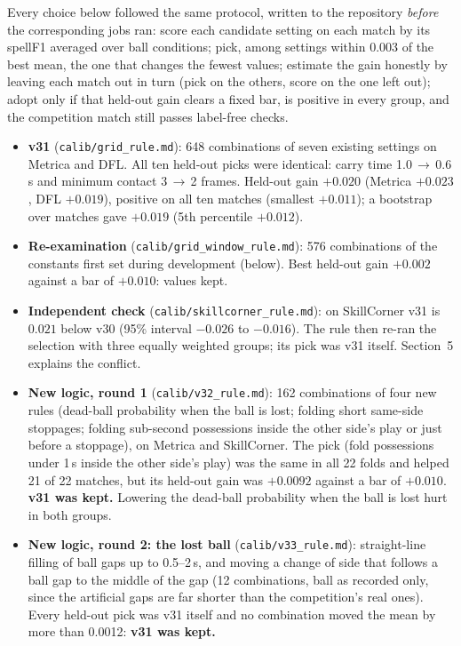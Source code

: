 \documentclass[11pt,a4paper]{article}
\newcommand{\code}[1]{\texttt{#1}}
\newcommand{\st}[1]{\textbf{#1}}
\begin{document}
Every choice below followed the same protocol, written to the
repository \emph{before} the corresponding jobs ran: score each candidate setting on each match by
its spellF1 averaged over ball conditions; pick, among settings within 0.003 of the best mean, the
one that changes the fewest values; estimate the gain honestly by leaving each match out in turn
(pick on the others, score on the one left out); adopt only if that held-out gain clears a fixed
bar, is positive in every group, and the competition match still passes label-free checks.

\begin{itemize}
\item \st{v31} (\code{calib/grid\_rule.md}): 648 combinations of seven existing settings on Metrica and
DFL. All ten held-out picks were identical: carry time 1.0\,$\rightarrow$\,0.6\,s and minimum contact
3\,$\rightarrow$\,2 frames. Held-out gain $+0.020$ (Metrica $+0.023$, DFL $+0.019$), positive on all ten
matches (smallest $+0.011$); a bootstrap over matches gave $+0.019$ (5th percentile $+0.012$).
\item \st{Re-examination} (\code{calib/grid\_window\_rule.md}): 576 combinations of the constants
first set during development (below). Best held-out gain $+0.002$ against a bar of $+0.010$: values kept.
\item \st{Independent check} (\code{calib/skillcorner\_rule.md}): on SkillCorner v31 is $0.021$ below v30
(95\% interval $-0.026$ to $-0.016$). The rule then re-ran the selection with three equally weighted
groups; its pick was v31 itself. Section~5 explains the conflict.
\item \st{New logic, round 1} (\code{calib/v32\_rule.md}): 162 combinations of four new rules
(dead-ball probability when the ball is lost; folding short same-side stoppages; folding sub-second
possessions inside the other side's play or just before a stoppage), on Metrica and SkillCorner.
The pick (fold possessions under 1\,s inside the other side's play) was the same in all 22 folds and
helped 21 of 22 matches, but its held-out gain was $+0.0092$ against a bar of $+0.010$. \textbf{v31
was kept.} Lowering the dead-ball probability when the ball is lost hurt in both groups.
\item \st{New logic, round 2: the lost ball} (\code{calib/v33\_rule.md}): straight-line filling of ball gaps up to 0.5--2\,s, and moving a change of side that follows a ball gap to the middle of the gap (12 combinations, ball as recorded only, since the artificial gaps are far shorter than the competition's real ones). Every held-out pick was v31 itself and no combination moved the mean by more than 0.0012: \textbf{v31 was kept.}

\end{itemize}
\end{document}
